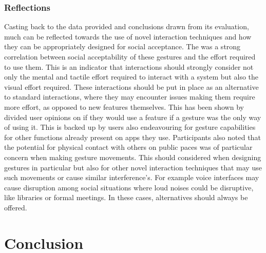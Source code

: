 \documentclass{l4proj}
\begin{document}
\subsection{Reflections}
Casting back to the data provided and conclusions drawn from its evaluation, much can be reflected towards the use of novel interaction techniques and how they can be appropriately designed for social acceptance. The was a strong correlation between social acceptability of these gestures and the effort required to use them. This is an indicator that interactions should strongly consider not only the mental and tactile effort required to interact with a system but also the visual effort required. These interactions should be put in place as an alternative to standard interactions, where they may encounter issues making them require more effort, as opposed to new features themselves. This has been shown by divided user opinions on if they would use a feature if a gesture was the only way of using it. This is backed up by users also endeavouring for gesture capabilities for other functions already present on apps they use. Participants also noted that the potential for physical contact with others on public paces was of particular concern when making gesture movements. This should considered when designing gestures in particular but also for other novel interaction techniques that may use such movements or cause similar interference's. For example voice interfaces may cause disruption among social situations where loud noises could be disruptive, like libraries or formal meetings. In these cases, alternatives should always be offered.


\chapter{Conclusion}  
\end{document}
